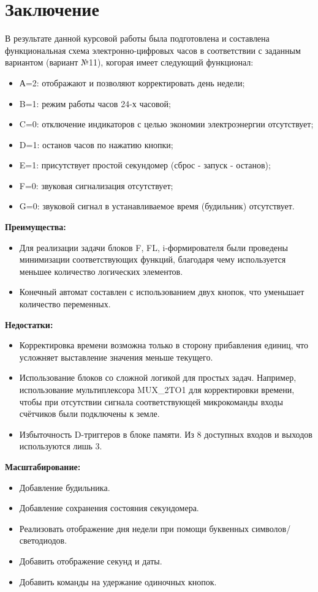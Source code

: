 \documentclass[a4paper, final]{article}
\begin{document}
\section*{Заключение}
В результате данной курсовой работы была подготовлена и составлена функциональная схема электронно-цифровых часов в соответствии с заданным вариантом (вариант №11), когорая имеет следующий функционал:
\begin{itemize}
  \item А=2: отображают и позволяют корректировать день недели;
  \item B=1: режим работы часов 24-х часовой;
  \item C=0: отключение индикаторов с целью экономии электроэнергии отсутствует; 
  \item D=1: останов часов по нажатию кнопки;
  \item E=1: присутствует простой секундомер (сброс - запуск - останов);
  \item F=0: звуковая сигнализация отсутствует; 
  \item G=0: звуковой сигнал в устанавливаемое время (будильник) отсутствует.
\end{itemize}

\noindent \textbf{Преимущества:}
\begin{itemize}
\item Для реализации задачи блоков F, FL, i-формирователя были проведены минимизации соответствующих функций, благодаря чему используется меньшее количество логических элементов.
\item Конечный автомат составлен с использованием двух кнопок, что уменьшает количество переменных.
\end{itemize}

\noindent \textbf{Недостатки:}
\begin{itemize}
\item Корректировка времени возможна только в сторону прибавления единиц, что усложняет выставление значения меньше текущего.
\item Использование блоков со сложной логикой для простых задач. Например, использование мультиплексора MUX\_2TO1 для корректировки времени, чтобы при отсутствии сигнала соответствующей микрокоманды входы счётчиков были подключены к земле.
\item Избыточность D-триггеров в блоке памяти. Из 8 доступных входов и выходов используются лишь 3.
\end{itemize}

\noindent \textbf{Масштабирование:}
\begin{itemize}
\item Добавление будильника.
\item Добавление сохранения состояния секундомера.
\item Реализовать отображение дня недели при помощи буквенных символов/светодиодов.
\item Добавить отображение секунд и даты.
\item Добавить команды на удержание одиночных кнопок.
\end{itemize}
\end{document}
